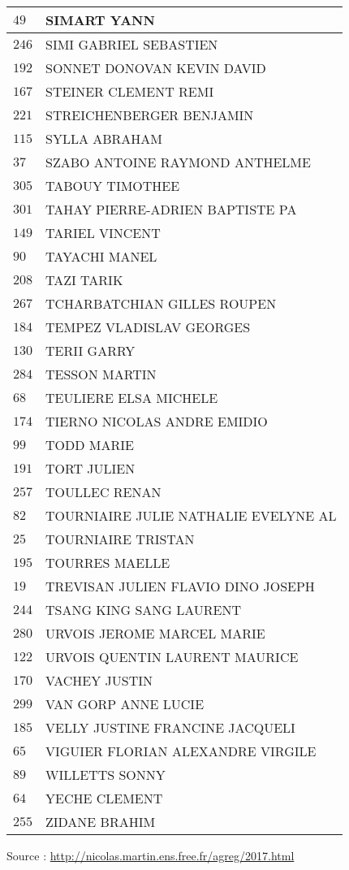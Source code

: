 \begin{xltabular}{\linewidth}{|l|X|}
    \hline
    $49$ & SIMART YANN \\
    \hline
    $246$ & SIMI GABRIEL SEBASTIEN \\
    \hline
    $192$ & SONNET DONOVAN KEVIN DAVID \\
    \hline
    $167$ & STEINER CLEMENT REMI \\
    \hline
    $221$ & STREICHENBERGER BENJAMIN \\
    \hline
    $115$ & SYLLA ABRAHAM \\
    \hline
    $37$ & SZABO ANTOINE RAYMOND ANTHELME \\
    \hline
    $305$ & TABOUY TIMOTHEE \\
    \hline
    $301$ & TAHAY PIERRE-ADRIEN BAPTISTE PA \\
    \hline
    $149$ & TARIEL VINCENT \\
    \hline
    $90$ & TAYACHI MANEL \\
    \hline
    $208$ & TAZI TARIK \\
    \hline
    $267$ & TCHARBATCHIAN GILLES ROUPEN \\
    \hline
    $184$ & TEMPEZ VLADISLAV GEORGES \\
    \hline
    $130$ & TERII GARRY \\
    \hline
    $284$ & TESSON MARTIN \\
    \hline
    $68$ & TEULIERE ELSA MICHELE \\
    \hline
    $174$ & TIERNO NICOLAS ANDRE EMIDIO \\
    \hline
    $99$ & TODD MARIE \\
    \hline
    $191$ & TORT JULIEN \\
    \hline
    $257$ & TOULLEC RENAN \\
    \hline
    $82$ & TOURNIAIRE JULIE NATHALIE EVELYNE AL \\
    \hline
    $25$ & TOURNIAIRE TRISTAN \\
    \hline
    $195$ & TOURRES MAELLE \\
    \hline
    $19$ & TREVISAN JULIEN FLAVIO DINO JOSEPH \\
    \hline
    $244$ & TSANG KING SANG LAURENT \\
    \hline
    $280$ & URVOIS JEROME MARCEL MARIE \\
    \hline
    $122$ & URVOIS QUENTIN LAURENT MAURICE \\
    \hline
    $170$ & VACHEY JUSTIN \\
    \hline
    $299$ & VAN GORP ANNE LUCIE \\
    \hline
    $185$ & VELLY JUSTINE FRANCINE JACQUELI \\
    \hline
    $65$ & VIGUIER FLORIAN ALEXANDRE VIRGILE \\
    \hline
    $89$ & WILLETTS SONNY \\
    \hline
    $64$ & YECHE CLEMENT \\
    \hline
    $255$ & ZIDANE BRAHIM \\
    \hline
  \end{xltabular}

  \begin{flushright}
    {\tiny Source : \url{http://nicolas.martin.ens.free.fr/agreg/2017.html}}
  \end{flushright}

